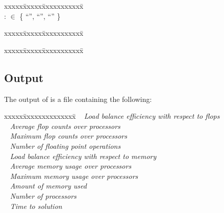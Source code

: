\documentclass[10pt]{article}
\begin{document}
\begin{tabbing}
xxxxx\=xxxxx\=xxxxxxxxxxx\=\kill
\> \done\    \\
\> \> :     \>  $\in$ \{ ``'', ``'', ``'' \}
\end{tabbing}
\begin{tabbing}
xxxxx\=xxxxx\=xxxxxxxxxxx\=\kill
\> \done\   
\end{tabbing}
\begin{tabbing}
xxxxx\=xxxxx\=xxxxxxxxxxx\=\kill
\> \done\   
\end{tabbing}


\subsection{Output}

The output of  is a file containing the following:

\begin{tabbing}
xxxxx\=xxxxxxxxxxxxxx\=\kill
\> \todo\  \>    \textit{Load balance efficiency with respect to flops}\\
\> \todo\  \> \textit{Average flop counts over processors} \\
\> \todo\  \> \textit{Maximum flop counts over processors} \\
\> \todo\  \> \textit{Number of floating point operations} \\
\> \todo\  \>    \textit{Load balance efficiency with respect to memory}\\
\> \todo\  \> \textit{Average memory usage over processors} \\
\> \todo\  \>    \textit{Maximum memory usage over processors} \\
\> \todo\  \> \textit{Amount of memory used} \\
\> \todo\  \> \textit{Number of processors} \\
\> \todo\  \>  \textit{Time to solution}
\end{tabbing}
\end{document}
